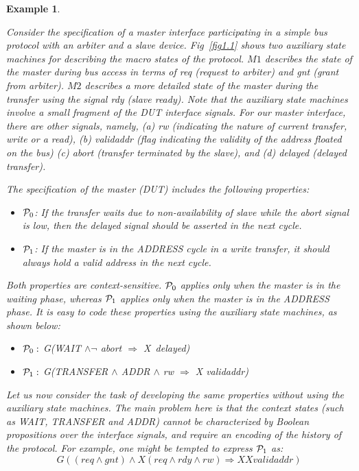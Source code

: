 \documentclass[a4paper, 11pt]{article}
\newtheorem{example}{Example} %
\begin{document}
\begin{example} \label{eg1}
{\em Consider the specification of a master interface participating in a 
simple bus
protocol with an arbiter and a slave device. Fig~\ref{fig1.1} shows two
auxiliary
state machines for describing the macro states of the protocol. $M1$ describes
the state of the master during bus access in terms of {\em req} (request to
arbiter) and {\em gnt} (grant from arbiter). $M2$ describes a more detailed
state
of the master during the transfer using the signal {\em rdy} (slave ready). 
Note that the auxiliary state machines involve a small fragment of the DUT 
interface signals. For our master interface, there are other signals, namely,
(a) {\em rw} (indicating the nature of current transfer, write or a read),
(b) {\em validaddr} (flag indicating the validity of the address floated on the bus)
(c) {\em abort} (transfer terminated by the slave), and
(d) {\em delayed} (delayed transfer).

The specification of the master (DUT) includes the following properties:
\begin{itemize}

\item ${\cal P}_0$: If the transfer waits due to non-availability of slave
        while
        the abort signal is low, then the delayed signal should be asserted 
		in the next cycle.
\item ${\cal P}_1$: If the master is in the ADDRESS cycle in a write transfer,
        it should always hold a valid address in the next cycle.

\end{itemize}

\noindent
Both properties are context-sensitive. ${\cal P}_0$ applies only when the 
master is in the waiting phase, whereas ${\cal P}_1$ applies only when the 
master is in
the ADDRESS phase. It is easy to code these properties using the auxiliary
state machines, as shown below:
\begin{itemize}
\item ${\cal P}_0:$ G(WAIT $\land \neg$ abort $\Rightarrow$ X\ delayed)
\item ${\cal P}_1:$ G(TRANSFER $\land$ ADDR $\land$ rw $\Rightarrow$ X validaddr)
\end{itemize}

\noindent
Let us now consider the task of developing the same properties without using
the auxiliary state machines. The main problem here is that the context states
(such as WAIT, TRANSFER and ADDR) cannot be characterized by Boolean 
propositions
over the interface signals, and require an encoding of the history of the
protocol. For example, one might be tempted to express ${\cal P}_1$ as:
\[G((req \land gnt) \land X(req \land rdy \land rw)\Rightarrow XX validaddr) \]

}
\end{example}
\end{document}
